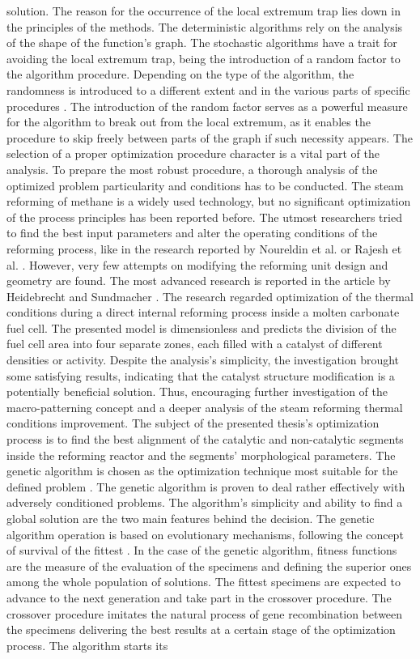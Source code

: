 \documentclass[preprint,12pt]{elsarticle}
\begin{document}
solution. The reason for the occurrence of the local extremum trap lies down in the principles of the methods. The deterministic algorithms rely on the analysis of the shape of the function’s graph. The stochastic algorithms have a trait for avoiding the local extremum trap, being the introduction of a random factor to the algorithm procedure. Depending on the type of the algorithm, the randomness is introduced to a different extent and in the various parts of specific procedures \cite{Albrecht2003, Spall2012}. The introduction of the random factor serves as a powerful measure for the algorithm to break out from the local extremum, as it enables the procedure to skip freely between parts of the graph if such necessity appears. The selection of a proper optimization procedure character is a vital part of the analysis. To prepare the most robust procedure, a thorough analysis of the optimized problem particularity and conditions has to be conducted. The steam reforming of methane is a widely used technology, but no significant optimization of the process principles has been reported before. The utmost researchers tried to find the best input parameters and alter the operating conditions of the reforming process, like in the research reported by Noureldin et al. or Rajesh et al. \cite{Noureldin2014, Rajesh2000}. However, very few attempts on modifying the reforming unit design and geometry are found. The most advanced research is reported in the article by Heidebrecht and Sundmacher \cite{Heidebrecht2005}. The research regarded optimization of the thermal conditions during a direct internal reforming process inside a molten carbonate fuel cell. The presented model is dimensionless and predicts the division of the fuel cell area into four separate zones, each filled with a catalyst of different densities or activity. Despite the analysis's simplicity, the investigation brought some satisfying results, indicating that the catalyst structure modification is a potentially beneficial solution. Thus, encouraging further investigation of the macro-patterning concept and a deeper analysis of the steam reforming thermal conditions improvement. The subject of the presented thesis's optimization process is to find the best alignment of the catalytic and non-catalytic segments inside the reforming reactor and the segments' morphological parameters. The genetic algorithm is chosen as the optimization technique most suitable for the defined problem \cite{Fouskakis2002}. The genetic algorithm is proven to deal rather effectively with adversely conditioned problems. The algorithm's simplicity and ability to find a global solution are the two main features behind the decision. The genetic algorithm operation is based on evolutionary mechanisms, following the concept of survival of the fittest \cite{Goldberg1989}. In the case of the genetic algorithm, fitness functions are the measure of the evaluation of the specimens and defining the superior ones among the whole population of solutions. The fittest specimens are expected to advance to the next generation and take part in the crossover procedure. The crossover procedure imitates the natural process of gene recombination between the specimens delivering the best results at a certain stage of the optimization process. The algorithm starts its 
\end{document}

